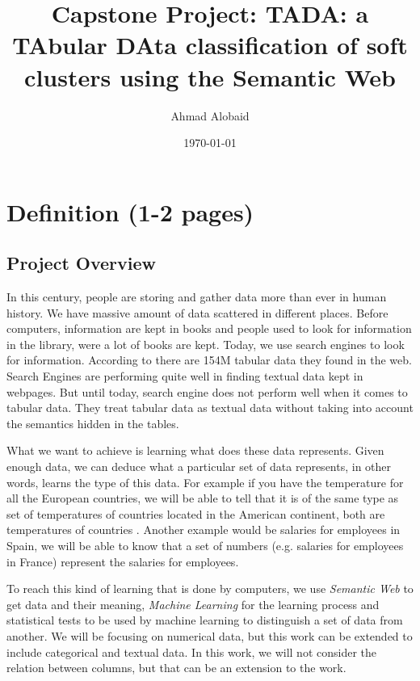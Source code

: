 \documentclass{article}
\title{Capstone Project: TADA: a TAbular DAta classification of soft clusters using the Semantic Web}
\author{Ahmad Alobaid}
\date{\today}
\begin{document}
 
\maketitle
 
\tableofcontents

\clearpage
\section{Definition (1-2 pages)}

\subsection{Project Overview}
In this century, people are storing and gather data more than ever in human history. We have massive amount of data scattered in different places. Before computers, information are kept in books and people used to look for information in the library, were a lot of books are kept. Today, we use search engines to look for information. According to \cite{webtables-power-2008} there are 154M tabular data they found in the web. Search Engines are performing quite well in finding textual data kept in webpages. But until today, search engine does not perform well when it comes to tabular data. They treat tabular data as textual data without taking into account the semantics hidden in the tables.

What we want to achieve is learning what does these data represents. Given enough data, we can deduce what a particular set of data represents, in other words, learns the type of this data. For example if you have the temperature for all the European countries, we will be able to tell that it is of the same type as set of temperatures of countries located in the American continent, both are temperatures of countries . Another example would be salaries for employees in Spain, we will be able to know that a set of numbers (e.g. salaries for employees in France) represent the salaries for employees. 

To reach this kind of learning that is done by computers, we use \textit{Semantic Web} to get data and their meaning, \textit{Machine Learning} for the learning process and statistical tests to be used by machine learning to distinguish a set of data from another. We will be focusing on numerical data, but this work can be extended to include categorical and textual data. In this work, we will not consider the relation between columns, but that can be an extension to the work. 
\end{document}
